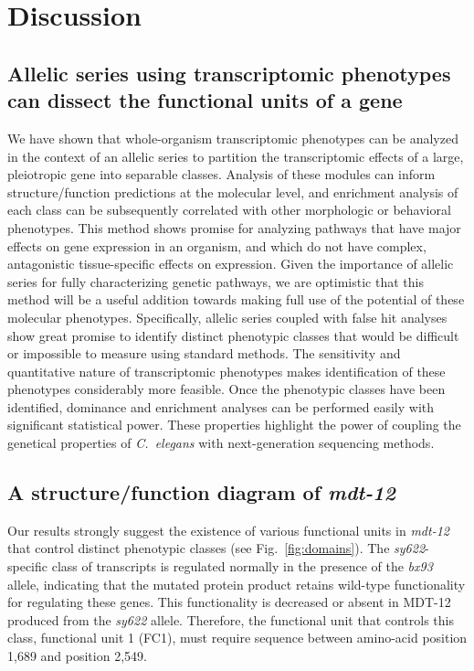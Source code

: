 \documentclass[10pt, twocolumn]{article}
\newcommand{\cel}{\emph{C.~elegans}}
\newcommand{\gene}[1]{\mbox{\emph{#1}}}
\newcommand{\protein}[1]{\mbox{\uppercase{#1}}}
\newcommand{\dpy}{\gene{mdt-12}}
\begin{document}
\section*{Discussion}
\label{sec:conclusions}
\subsection*{Allelic series using transcriptomic phenotypes can dissect the
             functional units of a gene}
We have shown that whole-organism transcriptomic phenotypes can be analyzed in
the context of an allelic series to partition the transcriptomic effects of a
large, pleiotropic gene into separable classes. Analysis of these modules can
inform structure/function predictions at the molecular level, and enrichment
analysis of each class can be subsequently correlated with other morphologic or
behavioral phenotypes. This method shows promise for analyzing pathways that
have major effects on gene expression in an organism, and which do not have
complex, antagonistic tissue-specific effects on expression. Given the
importance of allelic series for fully characterizing genetic pathways, we are
optimistic that this method will be a useful addition towards making full use of
the potential of these molecular phenotypes. Specifically, allelic series
coupled with false hit analyses show great promise to identify distinct
phenotypic classes that would be difficult or impossible to measure using
standard methods. The sensitivity and quantitative nature of transcriptomic
phenotypes makes identification of these phenotypes considerably more feasible.
Once the phenotypic classes have been identified, dominance and enrichment
analyses can be performed easily with significant statistical power. These
properties highlight the power of coupling the genetical properties of \cel{}
with next-generation sequencing methods.

\subsection*{A structure/function diagram of \dpy{}}
Our results strongly suggest the existence of various functional units in \dpy{}
that control distinct phenotypic classes (see Fig.~\ref{fig:domains}). The
\emph{sy622}-specific class of transcripts is regulated normally in the presence
of the \emph{bx93} allele, indicating that the mutated protein product retains
wild-type functionality for regulating these genes. This functionality is
decreased or absent in \protein{mdt-12} produced from the \emph{sy622} allele.
Therefore, the functional unit that controls this class, functional unit 1 (FC1),
must require sequence between amino-acid position 1,689 and position 2,549.
\end{document}
